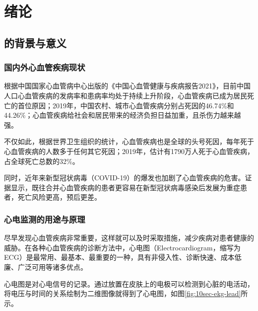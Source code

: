 

\chapter{绪论}\label{ch:intro}


\section{\app 的背景与意义}\label{sec:background}

\subsection{国内外心血管疾病现状}\label{subsec:disease}

根据中国国家心血管病中心出版的《中国心血管健康与疾病报告2021》，目前中国人口心血管疾病的发病率和患病率均处于持续上升阶段，心血管疾病已成为居民死亡的首位原因；2019年，中国农村、城市心血管疾病分别占死因的46.74\%和44.26\%；心血管疾病给社会和居民带来的经济负担日益加重，且杀伤力越来越强\cite{Zhongguoxinxieguanjiankangyujibingbaogao20212022}。

不仅如此，根据世界卫生组织的统计，心血管疾病也是全球的头号死因，每年死于心血管疾病的人数多于任何其它死因；2019年，估计有1790万人死于心血管疾病，占全球死亡总数的32\%\cite{CardiovascularDiseasesCVDs}。

同时，近年来新型冠状病毒（COVID-19）的爆发也加剧了心血管疾病的危害。证据显示，既往合并心血管疾病的患者更容易在新型冠状病毒感染后发展为重症患者，死亡风险更高，预后更差\cite{zhangXinxingguanzhuangbingdufeiyanyuxinxieguanjibing2020}。

\subsection{心电监测的用途与原理}\label{subsec:monitoring}

尽早发现心血管疾病非常重要，这样就可以及时采取措施，减少疾病对患者健康的威胁\cite{CardiovascularDiseasesCVDs}。在各种心血管疾病的诊断方法中，心电图（Electrocardiogram，缩写为ECG）是最常用、最基本、最重要的一种，具有非侵入性、诊断快速、成本低廉、广泛可用等诸多优点\cite{Xinxieguanjibingzhenduanliuchengyuzhiliaocelue2007}。

心电图是对心电信号的记录。通过放置在皮肤上的电极可以检测到心脏的电活动，将电压与时间的关系绘制为二维图像就得到了心电图，如图\ref{fig:10sec-ekg-lead}所示。

